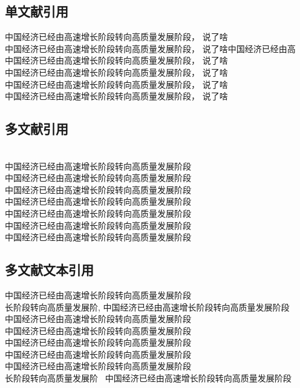 \documentclass{chinese-erj}
\begin{document}
\subsection{单文献引用}
中国经济已经由高速增长阶段转向高质量发展阶段，\noindent \textcite{cn1} 说了啥\\
中国经济已经由高速增长阶段转向高质量发展阶段，\textcite{cn2} 说了啥中国经济已经由高\\
中国经济已经由高速增长阶段转向高质量发展阶段，\textcite{cn3} 说了啥\\
中国经济已经由高速增长阶段转向高质量发展阶段，\textcite{en1} 说了啥\\
中国经济已经由高速增长阶段转向高质量发展阶段，\textcite{en2} 说了啥\\
中国经济已经由高速增长阶段转向高质量发展阶段，\textcite{en3}\parencite{en3} 说了啥\parencite[this is the first source][]{en1}\\
\newpage


\subsection{多文献引用}
\noindent\cite{cn1,cn2}\\
中国经济已经由高速增长阶段转向高质量发展阶段\cite{cn1,cn3}\\
中国经济已经由高速增长阶段转向高质量发展阶段 \cite{cn2,cn3}\\
中国经济已经由高速增长阶段转向高质量发展阶段\cite{cn1,cn2,cn3}\\
中国经济已经由高速增长阶段转向高质量发展阶段\cite{en1,en2}\\
中国经济已经由高速增长阶段转向高质量发展阶段\cite{en1,en3}\\
中国经济已经由高速增长阶段转向高质量发展阶段\cite{en2,en3}\\
中国经济已经由高速增长阶段转向高质量发展阶段\cite{en1,en2,en3}\\

\subsection{多文献文本引用}
\noindent\textcite{cn1,cn2} 中国经济已经由高速增长阶段转向高质量发展阶段\\
长阶段转向高质量发展阶,\textcite{cn1,cn3} 中国经济已经由高速增长阶段转向高质量发展阶段\\
\textcite{cn2,cn3} 中国经济已经由高速增长阶段转向高质量发展阶段\\
\textcite{cn1,cn2,cn3} 中国经济已经由高速增长阶段转向高质量发展阶段\\
\textcite{en1,en2} 中国经济已经由高速增长阶段转向高质量发展阶段\\
\textcite{en1,en3} 中国经济已经由高速增长阶段转向高质量发展阶段\\
\textcite{en2,en3} 中国经济已经由高速增长阶段转向高质量发展阶段\\
长阶段转向高质量发展阶~\textcite{en1,en2,en3} 中国经济已经由高速增长阶段转向高质量发展阶段\\
\end{document}
